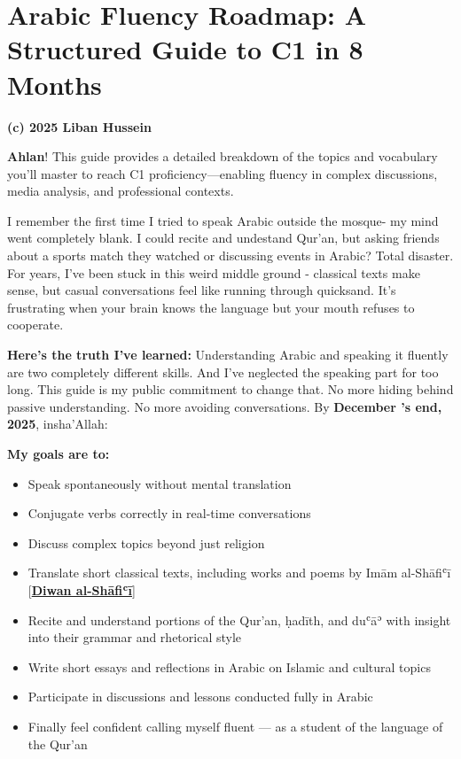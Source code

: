 \documentclass[
  arabic,
  letterpaper,
  DIV=11,
  numbers=noendperiod]{scrartcl}
\author{}
\date{}
\providecommand{\tightlist}{%
  \setlength{\itemsep}{0pt}\setlength{\parskip}{0pt}}
\begin{document}
\section{Arabic Fluency Roadmap: A Structured Guide to C1 in 8
Months}\label{arabic-fluency-roadmap-a-structured-guide-to-c1-in-8-months}

\textbf{(c) 2025 Liban Hussein}

\textbf{Ahlan}! This guide provides a detailed breakdown of the topics
and vocabulary you'll master to reach C1 proficiency---enabling fluency
in complex discussions, media analysis, and professional contexts.

I remember the first time I tried to speak Arabic outside the mosque- my
mind went completely blank. I could recite and undestand Qur'an, but
asking friends about a sports match they watched or discussing events in
Arabic? Total disaster. For years, I've been stuck in this weird middle
ground - classical texts make sense, but casual conversations feel like
running through quicksand. It's frustrating when your brain knows the
language but your mouth refuses to cooperate.

\textbf{Here's the truth I've learned:} Understanding Arabic and
speaking it fluently are two completely different skills. And I've
neglected the speaking part for too long. This guide is my public
commitment to change that. No more hiding behind passive understanding.
No more avoiding conversations. By \textbf{December 's end, 2025},
insha'Allah:

\textbf{My goals are to:}

\begin{itemize}
\tightlist
\item
  Speak spontaneously without mental translation
\item
  Conjugate verbs correctly in real-time conversations
\item
  Discuss complex topics beyond just religion
\item
  Translate short classical texts, including works and poems by Imām
  al-Shāfiʿī
  {[}\href{https://www.noor-book.com/en/ebook-\%D8\%AF\%D9\%8A\%D9\%88\%D8\%A7\%D9\%86-\%D8\%A7\%D9\%84\%D8\%A7\%D9\%85\%D8\%A7\%D9\%85-\%D8\%A7\%D9\%84\%D8\%B4\%D8\%A7\%D9\%81\%D8\%B9\%D9\%8A-pdf}{\textbf{Diwan
  al-Shāfiʿī}}{]}
\item
  Recite and understand portions of the Qur'an, ḥadīth, and duʿāʾ with
  insight into their grammar and rhetorical style
\item
  Write short essays and reflections in Arabic on Islamic and cultural
  topics
\item
  Participate in discussions and lessons conducted fully in Arabic
\item
  Finally feel confident calling myself fluent --- as a student of the
  language of the Qur'an
\end{itemize}
\end{document}
